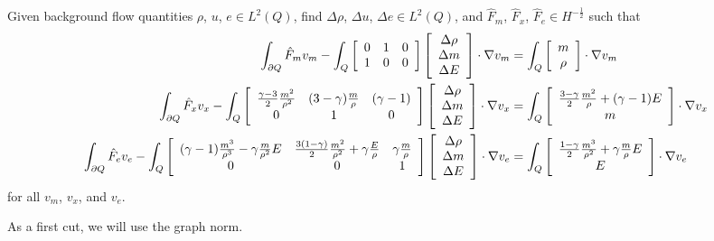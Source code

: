 \documentclass{article}
\begin{document}
Given background flow quantities $\rho$, $u$, $e\in L^2(Q)$, find $\Delta\rho$, $\Delta u$, $\Delta e\in L^2(Q)$, and $\hat F_m$, $\hat
F_x$, $\hat F_e\in H^{-\frac{1}{2}}$ such that
\begin{align*}
   \int_{\partial Q}\hat F_m v_m
   -
   \int_Q
\left[
\begin{array}{ccc}
   0 & 1 & 0\\
   1 & 0 & 0\\
\end{array}
\right]
\left[
\begin{array}{c}
   \Delta\rho\\
   \Delta m\\
   \Delta E\\
\end{array}
\right]\cdot\nabla v_m
&=
\int_Q
\left[
\begin{array}{c}
   m\\
   \rho\\
\end{array}
\right]
\cdot\nabla v_m\\
   \int_{\partial Q}\hat F_x v_x
   -
   \int_Q
\left[
\begin{array}{ccc}
   \frac{\gamma-3}{2}\frac{m^2}{\rho^2} & (3-\gamma)\frac{m}{\rho} & (\gamma-1)\\
   0 & 1 & 0\\
\end{array}
\right]
\left[
\begin{array}{c}
   \Delta\rho\\
   \Delta m\\
   \Delta E\\
\end{array}
\right]\cdot\nabla v_x
&=
\int_Q
\left[
\begin{array}{c}
   \frac{3-\gamma}{2}\frac{m^2}{\rho}+(\gamma-1)E\\
   m\\
\end{array}
\right]
\cdot\nabla v_x\\
   \int_{\partial Q}\hat F_e v_e
   -
   \int_Q
\left[
\begin{array}{ccc}
   (\gamma-1)\frac{m^3}{\rho^3}-\gamma\frac{m}{\rho^2}E &
   \frac{3(1-\gamma)}{2}\frac{m^2}{\rho^2}+\gamma\frac{E}{\rho}&
   \gamma\frac{m}{\rho}\\
   0 & 0 & 1\\
\end{array}
\right]
\left[
\begin{array}{c}
   \Delta\rho\\
   \Delta m\\
   \Delta E\\
\end{array}
\right]\cdot\nabla v_e
&=
\int_Q
\left[
\begin{array}{c}
   \frac{1-\gamma}{2}\frac{m^3}{\rho^2}+\gamma\frac{m}{\rho}E\\
   E\\
\end{array}
\right]
\cdot\nabla v_e
\end{align*}
for all $v_m$, $v_x$, and $v_e$.

As a first cut, we will use the graph norm.
\end{document}
